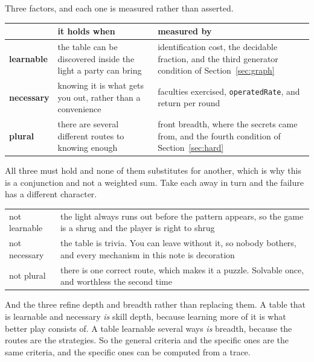 \documentclass[11pt,a4paper]{article}
\begin{document}
Three factors, and each one is measured rather than asserted.

\begin{center}
\begin{tabular}{@{}l@{\hspace{3mm}}>{\raggedright\arraybackslash}p{}@{\hspace{3mm}}>{\raggedright\arraybackslash}p{}@{}}
\toprule
& \textbf{it holds when} & \textbf{measured by} \\
\midrule
\textbf{learnable} & the table can be discovered inside the light a party can bring &
identification cost, the decidable fraction, and the third generator condition of
Section~\ref{sec:graph} \\[1mm]
\textbf{necessary} & knowing it is what gets you out, rather than a convenience &
faculties exercised, \texttt{operatedRate}, and return per round \\[1mm]
\textbf{plural}    & there are several different routes to knowing enough &
front breadth, where the secrets came from, and the fourth condition of
Section~\ref{sec:hard} \\
\bottomrule
\end{tabular}
\end{center}

All three must hold and none of them substitutes for another, which is why this is a conjunction
and not a weighted sum. Take each away in turn and the failure has a different character.

\begin{center}
\begin{tabular}{@{}l@{\hspace{5mm}}>{\raggedright\arraybackslash}p{}@{}}
\toprule
not learnable & the light always runs out before the pattern appears, so the game is a shrug and
the player is right to shrug \\[1mm]
not necessary & the table is trivia. You can leave without it, so nobody bothers, and every
mechanism in this note is decoration \\[1mm]
not plural    & there is one correct route, which makes it a puzzle. Solvable once, and worthless
the second time \\
\bottomrule
\end{tabular}
\end{center}

\begin{sectionbox}
And the three refine depth and breadth rather than replacing them. A table that is learnable and
necessary \emph{is} skill depth, because learning more of it is what better play consists of. A
table learnable several ways \emph{is} breadth, because the routes are the strategies. So the
general criteria and the specific ones are the same criteria, and the specific ones can be computed
from a trace.
\end{sectionbox}
\end{document}

